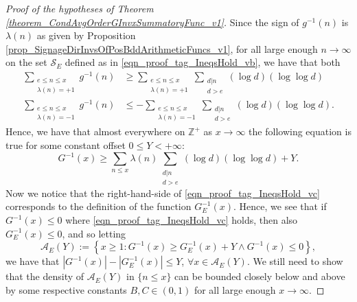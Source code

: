 \documentclass[11pt,reqno,a4letter]{article}
\numberwithin{figure}{section}
\numberwithin{table}{section}
\theoremstyle{plain}
\numberwithin{theorem}{section}
\theoremstyle{definition}
\begin{document}
\begin{proof}[Proof of the hypotheses of Theorem \ref{theorem_CondAvgOrderGInvxSummatoryFunc_v1}]
Since the sign of $g^{-1}(n)$ is $\lambda(n)$ as given by 
Proposition \ref{prop_SignageDirInvsOfPosBddArithmeticFuncs_v1}, for all large enough $n \rightarrow \infty$ 
on the set $\mathcal{S}_E$ defined as in 
\eqref{eqn_proof_tag_IneqsHold_vb}, we have that both 
\begin{align*} 
\sum_{\substack{e \leq n \leq x \\ \lambda(n) = +1}} g^{-1}(n) & \geq 
     \sum_{\substack{e \leq n \leq x \\ \lambda(n) = +1}} 
     \sum_{\substack{d|n \\ d > e}} (\log d) (\log\log d) \\ 
\sum_{\substack{e \leq n \leq x \\ \lambda(n) = -1}} g^{-1}(n) & \leq 
     -\sum_{\substack{e \leq n \leq x \\ \lambda(n) = -1}}
     \sum_{\substack{d|n \\ d > e}} (\log d) (\log\log d). 
\end{align*} 
Hence, we have that almost everywhere on $\mathbb{Z}^{+}$ as $x \rightarrow \infty$ the 
following equation is true for some constant offset $0 \leq Y < +\infty$: 
\begin{equation} 
\label{eqn_proof_tag_IneqsHold_vc} 
G^{-1}(x) \geq \sum_{n \leq x} \lambda(n) \sum_{\substack{d|n \\ d > e}} (\log d) (\log\log d) + Y. 
\end{equation} 
Now we notice that the right-hand-side of \eqref{eqn_proof_tag_IneqsHold_vc} corresponds to the definition of 
the function $G_E^{-1}(x)$. Hence, we see that if $G^{-1}(x) \leq 0$ where 
\eqref{eqn_proof_tag_IneqsHold_vc} holds, then also 
$G_E^{-1}(x) \leq 0$, and so letting 
\[
\mathcal{A}_E(Y) := \left\{x \geq 1: 
     G^{-1}(x) \geq G_E^{-1}(x) + Y \wedge G^{-1}(x) \leq 0 
     \right\}, 
\] 
we have that $|G^{-1}(x)| - |G_E^{-1}(x)| \leq Y$, $\forall x \in \mathcal{A}_E(Y)$. 
We still need to show that the density of $\mathcal{A}_E(Y)$ in $\{n \leq x\}$ can be bounded closely 
below and above by some respective constants $B, C \in (0, 1)$ 
for all large enough $x \rightarrow \infty$. 


\end{proof}
\end{document}

